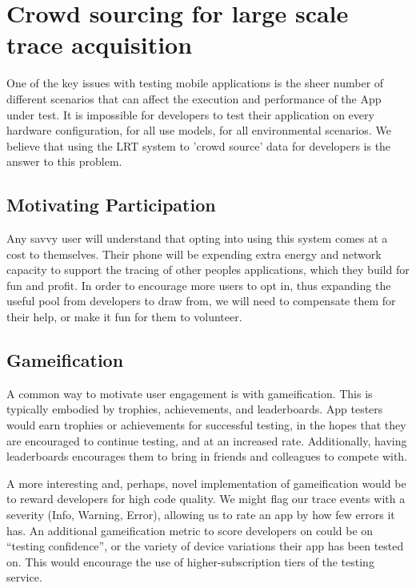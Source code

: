 \section{Crowd sourcing for large scale trace acquisition}
\label{section:crowdsourcing}
One of the key issues with testing mobile applications is the sheer number
of different scenarios that can affect the execution and performance
of the App under test. It is impossible for developers to test their application
on every hardware configuration, for all use models, for all environmental scenarios.
We believe that using the LRT system to 'crowd source' data for developers
is the answer to this problem.

\subsection{Motivating Participation}
\label{subsectionsection:motivatingparticipation}
Any savvy user will understand that opting into using this system comes at a cost to themselves.
Their phone will be expending extra energy and network capacity to support the tracing of 
other peoples applications, which they build for fun and profit.
In order to encourage more users to opt in, thus expanding the useful pool from developers to draw from,
we will need to compensate them for their help, or make it fun for them to volunteer.

\subsection{Gameification}
A common way to motivate user engagement is with gameification. This is typically embodied
by trophies, achievements, and leaderboards. App testers would earn trophies or achievements
for successful testing, in the hopes that they are encouraged to continue testing, and at an
increased rate. Additionally, having leaderboards encourages them to bring in friends and colleagues
to compete with.

A more interesting and, perhaps, novel implementation of gameification would be to reward developers
for high code quality. We might flag our trace events with a severity (Info, Warning, Error), allowing
us to rate an app by how few errors it has. An additional gameification metric to score developers on
could be on ``testing confidence'', or the variety of device variations their app has been tested on.
This would encourage the use of higher-subscription tiers of the testing service.

